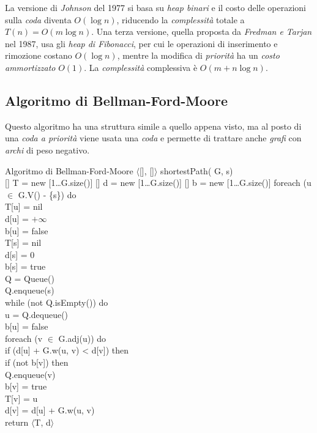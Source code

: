 La versione di \emph{Johnson} del 1977 si basa su \emph{heap binari} e il costo
delle operazioni sulla \emph{coda} diventa $O(\log n)$, riducendo la
\emph{complessità} totale a $T(n)=O(m\log n)$. Una terza versione, quella
proposta da \emph{Fredman e Tarjan} nel 1987, usa gli \emph{heap di Fibonacci},
per cui le operazioni di inserimento e rimozione costano $O(\log n)$, mentre la
modifica di \emph{priorità} ha un \emph{costo ammortizzato} $O(1)$. La
\emph{complessità} complessiva è $O(m+n\log n)$.

\subsection{Algoritmo di Bellman-Ford-Moore}
Questo algoritmo ha una struttura simile a quello appena visto, ma al posto di
una \emph{coda a priorità} viene usata una \emph{coda}  e permette
di trattare anche \emph{grafi} con \emph{archi} di peso negativo.

\begin{minicode}{Algoritmo di Bellman-Ford-Moore}
\ind$\langle$[], []$\rangle$ shortestPath( G,  s)\\
[] T = new [1\dots G.size()]\hfill{}
[] d = new [1\dots G.size()]\hfill{}
[] b = new [1\dots G.size()]\hfill{}
\indf foreach (u $\in$ G.V() - \{s\}) do\\
    T[u] = nil\\
    d[u] = $+\infty$\\
    b[u] = false\\
\indf T[s] = nil\\
\indf d[s] = 0\\
\indf b[s] = true\\
\indf{} Q = Queue()\\
\indf Q.enqueue(s)\\
\indf while (not Q.isEmpty()) do\\
     u = Q.dequeue()\\
    b[u] = false\\
    \indff foreach (v $\in$ G.adj(u)) do\\
        \indfff if (d[u] + G.w(u, v) < d[v]) then\\
            \indffff if (not b[v]) then\\
                Q.enqueue(v)\\
                b[v] = true\\
        \indfff T[v] = u\\
        \indfff d[v] = d[u] + G.w(u, v)\\
\indf return $\langle$T, d$\rangle$
\end{minicode}

